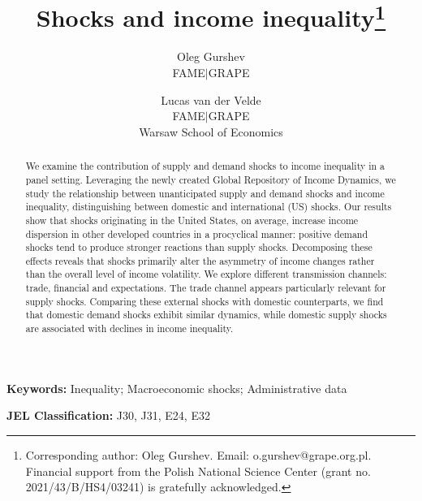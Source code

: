 \documentclass[12pt, a4paper]{article}
\title{Shocks and income inequality\thanks{Corresponding author: Oleg Gurshev. Email: o.gurshev@grape.org.pl.\\Financial support from the Polish National Science Center (grant no. 2021/43/B/HS4/03241) is gratefully acknowledged.}}%
\author{
    Oleg Gurshev  \\ 
    \small{FAME$\mid$GRAPE} 
    \and 
    Lucas van der Velde \\ 
    \small{FAME$\mid$GRAPE} \\[-0.5em] 
    \small{Warsaw School of Economics}
}
\date{}
\begin{document}
\maketitle
\thispagestyle{empty}
\begin{abstract}
\noindent 
We examine the contribution of supply and demand shocks to income inequality in a panel setting. Leveraging the newly created Global Repository of Income Dynamics, we study the relationship between unanticipated supply and demand shocks and income inequality, distinguishing between domestic and international (US) shocks. Our results show that shocks originating in the United States, on average, increase income dispersion in other developed countries in a procyclical manner: positive demand shocks tend to produce stronger reactions than supply shocks. Decomposing these effects reveals that shocks primarily alter the asymmetry of income changes rather than the overall level of income volatility. We explore different transmission channels: trade, financial and expectations. The trade channel appears particularly relevant for supply shocks. Comparing these external shocks with domestic counterparts, we find that domestic demand shocks exhibit similar dynamics, while domestic supply shocks are associated with declines in income inequality.
\end{abstract}

\bigskip
\hspace*{15pt}\textbf{Keywords:} Inequality; Macroeconomic shocks; Administrative data
 
\hspace*{15pt}\textbf{JEL Classification:} J30, J31, E24, E32
\clearpage



\end{document}

